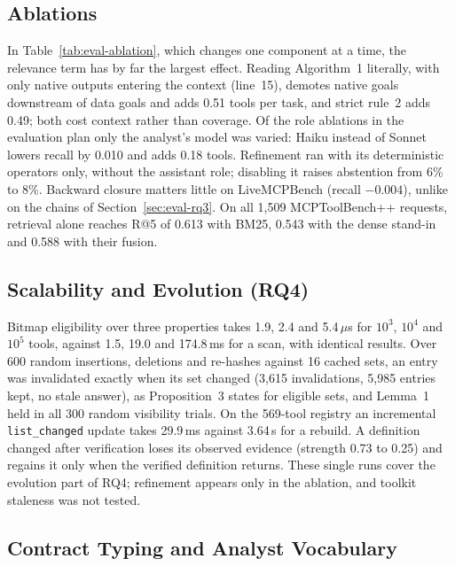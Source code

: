 \subsection{Ablations}
\label{sec:eval-ablation}



In Table~\ref{tab:eval-ablation}, which changes one component at a time, the relevance term has by far the
largest effect. Reading Algorithm~1 literally, with only native outputs entering the context (line~15), demotes native
goals downstream of data goals and adds 0.51 tools per task, and strict rule~2 adds 0.49; both cost context
rather than coverage. Of the role ablations in the evaluation plan only the analyst's model was varied: Haiku
instead of Sonnet lowers recall by 0.010 and adds 0.18 tools. Refinement ran with its deterministic operators
only, without the assistant role; disabling it raises abstention from 6\% to 8\%. Backward closure matters
little on LiveMCPBench (recall $-0.004$), unlike on the chains of Section~\ref{sec:eval-rq3}. On all 1,509
MCPToolBench++ requests, retrieval alone reaches R@5 of 0.613 with BM25, 0.543 with the dense stand-in and
0.588 with their fusion.

\subsection{Scalability and Evolution (RQ4)}
\label{sec:eval-rq4}

Bitmap eligibility over three properties takes 1.9, 2.4 and 5.4\,$\mu$s for $10^3$, $10^4$ and $10^5$ tools,
against 1.5, 19.0 and 174.8\,ms for a scan, with identical results. Over 600 random insertions, deletions and
re-hashes against 16 cached sets, an entry was invalidated exactly when its set changed (3,615 invalidations,
5,985 entries kept, no stale answer), as Proposition~3 states for eligible sets, and
Lemma~1 held in all 300 random visibility trials. On the 569-tool registry an incremental
\texttt{list\_changed} update takes 29.9\,ms against 3.64\,s for a rebuild. A definition changed after
verification loses its observed evidence (strength 0.73 to 0.25) and regains it only when the verified
definition returns. These single runs cover the evolution part of RQ4; refinement appears only in the
ablation, and toolkit staleness was not tested.

\subsection{Contract Typing and Analyst Vocabulary}
\label{sec:eval-e8}


